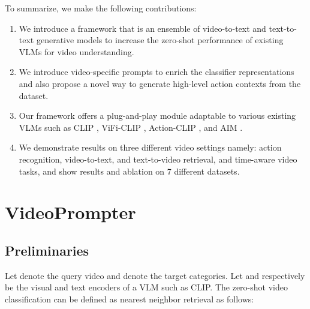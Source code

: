\documentclass{article} \usepackage{iclr2024_conference,times}
\begin{document}
To summarize, we make the following contributions:
\begin{enumerate}
        \item We introduce a framework that is an ensemble of video-to-text and text-to-text generative models to increase the zero-shot performance of existing VLMs for video understanding.        
        \item We introduce video-specific prompts to enrich the classifier representations and also propose a novel way to generate high-level action contexts from the dataset.
        \item Our framework offers a plug-and-play module adaptable to various existing VLMs such as CLIP \citep{radford2021learning}, ViFi-CLIP \citep{Rasheed_2023_CVPR}, Action-CLIP \citep{wang2021actionclip}, and AIM \citep{yang2023aim}.
        \item We demonstrate results on three different video settings namely: action recognition, video-to-text, and text-to-video retrieval, and time-aware video tasks, and show results and ablation on 7 different datasets.
\end{enumerate}







































\section{VideoPrompter}


\subsection{Preliminaries}
Let  denote the query video and  denote the target categories. Let  and  respectively be the visual and text encoders of a VLM such as CLIP. The zero-shot video classification can be defined as nearest neighbor retrieval as follows:
\end{document}
